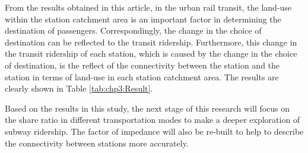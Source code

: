 %
From the results obtained in this article, in the urban rail transit, the land-use within the station catchment area is an important factor in determining the destination of passengers. Correspondingly, the change in the choice of destination can be reflected to the transit ridership. Furthermore, this change in the transit ridership of each station, which is caused by the change in the choice of destination, is the reflect of the connectivity between the station and the station in terms of land-use in each station catchment area. The results are clearly shown in Table \ref{tab:chp3:Result}.

%
Based on the results in this study, the next stage of this research will focus on the share ratio in different transportation modes to make a deeper exploration of subway ridership. The factor of impedance will also be re-built to help to describe the connectivity between stations more accurately.


